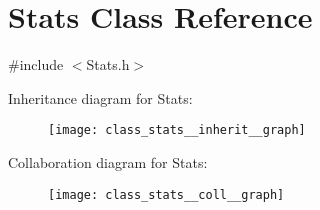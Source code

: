 \hypertarget{class_stats}{}\section{Stats Class Reference}
\label{class_stats}


{\ttfamily \#include $<$Stats.\+h$>$}



Inheritance diagram for Stats\+:\nopagebreak
\begin{figure}[H]
\begin{center}
\leavevmode
\texttt{[image: class\_stats\_\_inherit\_\_graph]}
\end{center}
\end{figure}


Collaboration diagram for Stats\+:\nopagebreak
\begin{figure}[H]
\begin{center}
\leavevmode
\texttt{[image: class\_stats\_\_coll\_\_graph]}
\end{center}
\end{figure}
